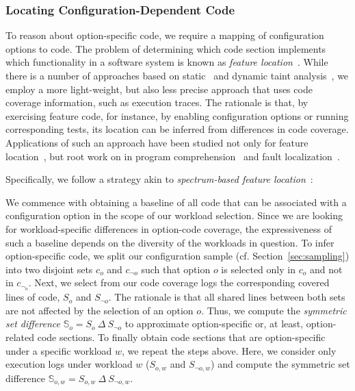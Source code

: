 {{{\subsubsection{Locating Configuration-Dependent Code}
To reason about option-specific code, we require a mapping of configuration options to code. 
The problem of determining which code section implements which functionality in a software system is known as \emph{feature location}~\cite{rubin_feature_2013}. 
While there is a number of approaches based on static~\cite{velez_2020_configcrusher_jase,lillack_2018_lotrack_tse,luo_2019_cova} and dynamic taint analysis~\cite{bell_phosphor_2014,velez_comprex_2021,splat_kim_2013}, we employ a more light-weight,  but also less precise approach that uses code coverage information, such as execution traces.
The rationale is that, by exercising feature code, for instance, by enabling configuration options or running corresponding tests, its location can be inferred from differences in code coverage. 
Applications of such an approach have been studied not only for feature location~\cite{wong_integrated_2005,sulir_annotation_2015,michelon_spectrum_2021,perez_framing_2016}, but root work on in program comprehension~\cite{wilde_early_1996,wilde_reconnaissance_1995,sherwood_reducing_nodate,perez_diagnosis_2014,castro_pangolin_2019} and fault localization~\cite{agrawal_fault_1995,wong_faultloc_2016}. 
}
Specifically, we follow  a strategy akin to  \textit{spectrum-based feature location}~\cite{michelon_spectrum_2021}:
{\color{black}
We commence with obtaining a baseline of all code that can be associated with a configuration option in the scope of our workload selection. Since we are looking for workload-specific differences in option-code coverage, the expressiveness of such a baseline depends on the diversity of the workloads in question. To infer option-specific code, we split our configuration sample (cf. Section~\ref{sec:sampling}) into two disjoint sets $c_o$ and $c_{\neg o}$ such that option $o$ is selected only in $c_o$ and not in $c_{\neg_o}$. Next, we select from our code coverage logs the corresponding covered lines of code, $S_o$ and $S_{\neg o}$.  The rationale is that all shared lines between both sets are not affected by the selection of an option $o$. Thus, we compute the \textit{symmetric set difference} $\mathbb{S}_o = S_o~\Delta~S_{\neg o}$ to approximate option-specific or, at least, option-related code sections. To finally obtain code sections that are option-specific under a specific workload $w$, we repeat the steps above. Here, we consider only execution logs under workload $w$ ($S_{o, w}$ and $S_{\neg o, w}$) and compute the symmetric set difference $\mathbb{S}_{o,w}=S_{o,w}~\Delta~S_{\neg o, w}.$


}}}
